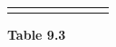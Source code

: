 {{\begin{center}
\begin{tabular}[t]{|l|l|l|l|l|l|l|l|}
    
         &
    
    
         &
    
    
         &
    
    
         &
    
    
         &
    
    
     \tabularnewline\cline{1-1}\cline{2-2}\cline{3-3}\cline{4-4}\cline{5-5}\cline{6-6}\cline{7-7}\cline{8-8}
    \end{tabular}
      \end{center}
    \begin{center}{\small\bfseries Table 9.3}\end{center}
    
    \addtocounter{footnote}{-0}
    
          }{ %
        
    
        \begin{center}
      

\end{center}}}
